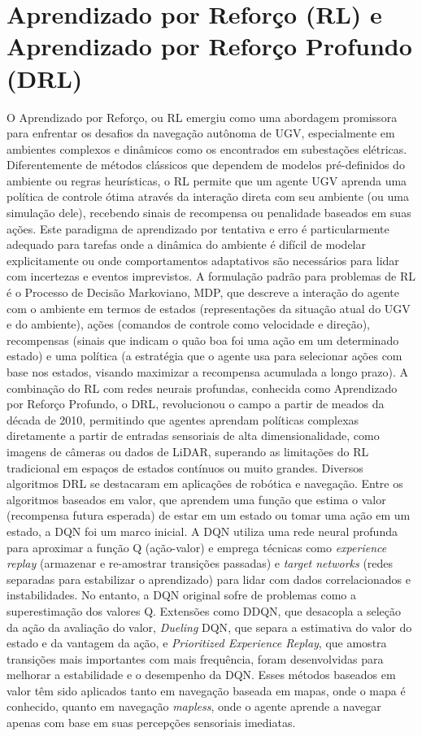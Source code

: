 \section{Aprendizado por Reforço (RL) e Aprendizado por Reforço Profundo (DRL)}
O Aprendizado por Reforço, ou \ac{RL} emergiu como uma abordagem promissora para enfrentar os desafios da navegação autônoma de \ac{UGV}, especialmente em ambientes complexos e dinâmicos como os encontrados em subestações elétricas. Diferentemente de métodos clássicos que dependem de modelos pré-definidos do ambiente ou regras heurísticas, o \ac{RL} permite que um agente \ac{UGV} aprenda uma política de controle ótima através da interação direta com seu ambiente (ou uma simulação dele), recebendo sinais de recompensa ou penalidade baseados em suas ações. Este paradigma de aprendizado por tentativa e erro é particularmente adequado para tarefas onde a dinâmica do ambiente é difícil de modelar explicitamente ou onde comportamentos adaptativos são necessários para lidar com incertezas e eventos imprevistos. A formulação padrão para problemas de \ac{RL} é o Processo de Decisão Markoviano, \ac{MDP}, que descreve a interação do agente com o ambiente em termos de estados (representações da situação atual do \ac{UGV} e do ambiente), ações (comandos de controle como velocidade e direção), recompensas (sinais que indicam o quão boa foi uma ação em um determinado estado) e uma política (a estratégia que o agente usa para selecionar ações com base nos estados, visando maximizar a recompensa acumulada a longo prazo).
A combinação do \ac{RL} com redes neurais profundas, conhecida como Aprendizado por Reforço Profundo, o \ac{DRL}, revolucionou o campo a partir de meados da década de 2010, permitindo que agentes aprendam políticas complexas diretamente a partir de entradas sensoriais de alta dimensionalidade, como imagens de câmeras ou dados de \ac{LiDAR}, superando as limitações do \ac{RL} tradicional em espaços de estados contínuos ou muito grandes. Diversos algoritmos \ac{DRL} se destacaram em aplicações de robótica e navegação. Entre os algoritmos baseados em valor, que aprendem uma função que estima o valor (recompensa futura esperada) de estar em um estado ou tomar uma ação em um estado, a \ac{DQN} foi um marco inicial. A \ac{DQN} utiliza uma rede neural profunda para aproximar a função Q (ação-valor) e emprega técnicas como \textit{experience replay} (armazenar e re-amostrar transições passadas) e \textit{target networks} (redes separadas para estabilizar o aprendizado) para lidar com dados correlacionados e instabilidades. No entanto, a \ac{DQN} original sofre de problemas como a superestimação dos valores Q. Extensões como \ac{DDQN}, que desacopla a seleção da ação da avaliação do valor, \textit{Dueling} \ac{DQN}, que separa a estimativa do valor do estado e da vantagem da ação, e \textit{Prioritized Experience Replay}, que amostra transições mais importantes com mais frequência, foram desenvolvidas para melhorar a estabilidade e o desempenho da \ac{DQN}. Esses métodos baseados em valor têm sido aplicados tanto em navegação baseada em mapas, onde o mapa é conhecido, quanto em navegação \textit{mapless}, onde o agente aprende a navegar apenas com base em suas percepções sensoriais imediatas.
